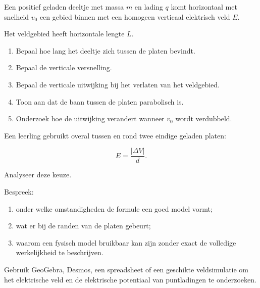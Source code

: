\documentclass{ximera}
\begin{document}
\begin{oefening}{\oefG}

Een positief geladen deeltje met massa $m$ en lading $q$ komt
horizontaal met snelheid $v_0$ een gebied binnen met een homogeen
verticaal elektrisch veld $E$.

Het veldgebied heeft horizontale lengte $L$.

\begin{enumerate}
  \item Bepaal hoe lang het deeltje zich tussen de platen bevindt.
  \item Bepaal de verticale versnelling.
  \item Bepaal de verticale uitwijking bij het verlaten van het
        veldgebied.
  \item Toon aan dat de baan tussen de platen parabolisch is.
  \item Onderzoek hoe de uitwijking verandert wanneer $v_0$ wordt
        verdubbeld.
\end{enumerate}

\end{oefening}


\begin{oefening}{\oefG}

Een leerling gebruikt overal tussen en rond twee eindige geladen platen:

\[
E=\frac{|\Delta V|}{d}.
\]

Analyseer deze keuze.

Bespreek:

\begin{enumerate}
  \item onder welke omstandigheden de formule een goed model vormt;
  \item wat er bij de randen van de platen gebeurt;
  \item waarom een fysisch model bruikbaar kan zijn zonder exact de
        volledige werkelijkheid te beschrijven.
\end{enumerate}

\end{oefening}




Gebruik GeoGebra, Desmos, een spreadsheet of een geschikte
veldsimulatie om het elektrische veld en de elektrische potentiaal van
puntladingen te onderzoeken.
\end{document}
